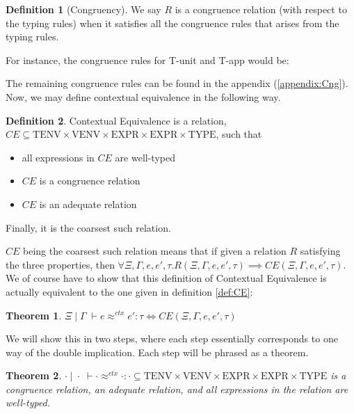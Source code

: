 \documentclass[twoside,11pt,openright]{report}
\newtheorem{theorem}{Theorem}
\theoremstyle{definition}
\newtheorem{definition}{Definition}[section]
\newcommand{\expr}{e}
\newcommand{\TT}{()}
\newcommand{\Tvar}{X}
\newcommand{\Tapp}[1]{#1\;\_}
\newcommand{\subst}[3]{#1{\left[#3 \middle/ #2 \right]}}
\newcommand{\Tunit}{\mathsf{Unit}}
\newcommand{\Tall}[2]{\forall #1.\; #2}
\newcommand{\typ}{\tau}
\newcommand{\venv}{\Gamma}
\newcommand{\tenv}{\Xi}
\newcommand{\VENV}{\mathrm{VENV}}
\newcommand{\TENV}{\mathrm{TENV}}
\newcommand{\EXPR}{\mathrm{EXPR}}
\newcommand{\TYPE}{\mathrm{TYPE}}
\newcommand{\jdgRel}[6]{#1 \; | \; #2 \; \vdash #3 \approx^{#4} #5 : #6}
\newcommand{\ctxRel}[5]{\jdgRel{#1}{#2}{#3}{ctx}{#4}{#5}}
\begin{document}
\begin{definition}[Congruency]
  We say $R$ is a congruence relation (with respect to the typing rules) when it satisfies all the congruence rules that arises from the typing rules.
\end{definition}
For instance, the congruence rules for T-unit and T-app would be:
The remaining congruence rules can be found in the appendix (\ref{appendix:Cng}).\\
Now, we may define contextual equivalence in the following way.
\begin{definition}\label{def:CE2}
  Contextual Equivalence is a relation, $CE \subseteq \TENV \times \VENV \times \EXPR \times \EXPR \times \TYPE$, such that
  \begin{itemize}
    \item all expressions in $CE$ are well-typed
    \item $CE$ is a congruence relation
    \item $CE$ is an adequate relation
  \end{itemize}
  Finally, it is the coarsest such relation.
\end{definition}
$CE$ being the coarsest such relation means that if given a relation $R$ satisfying the three properties, then $\forall \tenv, \venv, \expr, \expr', \typ . R(\tenv, \venv, \expr, \expr', \typ) \implies CE(\tenv, \venv, \expr, \expr', \typ)$.\\
We of course have to show that this definition of Contextual Equivalence is actually equivalent to the one given in definition \ref{def:CE}:
\begin{theorem}\label{thm:CE_eq}
  $\ctxRel{\tenv}{\venv}{\expr}{\expr'}{\typ} \iff CE(\tenv, \venv, \expr, \expr', \typ)$
\end{theorem}
We will show this in two steps, where each step essentially corresponds to one way of the double implication. Each step will be phrased as a theorem.
\begin{theorem}\label{thm:CE_eq_part1}
  $\ctxRel{\cdot}{\cdot}{\cdot}{\cdot}{\cdot} \subseteq \TENV \times \VENV \times \EXPR \times \EXPR \times \TYPE$ is a congruence relation, an adequate relation, and all expressions in the relation are well-typed.
\end{theorem}
\end{document}
